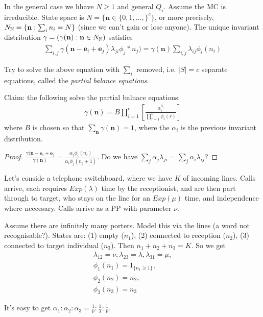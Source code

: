 \documentclass[a4paper]{article}
\begin{document}
In the general case we hhave $N \geq 1$ and general $Q_i$. Assume the MC is irreducible. State space is $N = \{\mathbf{n} \in \{0,1,...,\}^c\}$, or more precisely, $N_{\mathbb{N}} = \{\mathbf{n} : \sum_i n_i =N\}$ (since we can't gain or lose anyone). The unique invariant distribution $\gamma = (\gamma(\mathbf{n}):\mathbf{n} \in N_{\mathbb{N}})$ satisfies
\begin{equation*}
\begin{aligned}
\sum_{i,j} \gamma(\mathbf{n} - \mathbf{e}_i + \mathbf{e}_j) \lambda_{ji} \phi_j*n_j) = \gamma(\mathbf{n}) \sum_{i,j} \lambda_{ij} \phi_i(n_i)
\end{aligned}
\end{equation*}

Try to solve the above equation with $\sum_i$ removed, i.e. $|S| = c$ separate equations, called the \emph{partial balance equations}.

Claim: the following solve the partial balnace equations:
\begin{equation*}
\begin{aligned}
\gamma(\mathbf{n}) = B \prod_{i=1}^c \left[ \frac{\alpha_i^{n_i}}{\prod_{r=1}^{n_i} \phi_i(r)} \right]
\end{aligned}
\end{equation*}
where $B$ is chosen so that $\sum_{\mathbf{n}} \gamma(\mathbf{n}) = 1$, where the $\alpha_i$ is the previous invariant distribution.
\begin{proof}
$\frac{\gamma(\mathbf{n}-\mathbf{e}_i + \mathbf{e}_j}{\gamma(\mathbf{n})} = \frac{\alpha_j \phi_i(n_i)}{\alpha_i\phi_j(n_j+1)}$. Do we have $\sum_j \alpha_j \lambda_{ji} =\sum_j \alpha_i \lambda_{ij}$?
\end{proof}

\begin{eg}
Let's conside a telephone switchboard, where we have $K$ of incoming lines. Calls arrive, each requires $Exp(\lambda)$ time by the receptionist, and are then part through to target, who stays on the line for an $Exp(\mu)$ time, and independence where neccesary. Calls arrive as a PP with parameter $\nu$.

Assume there are infinitely many porters. Model this via the lines (a word not recognisable?). States are: (1) empty ($n_1$), (2) connected to reception ($n_2$), (3) connected to target individual ($n_3$). Then $n_1+n_2+n_3 = K$. So we get
\begin{equation*}
\begin{aligned}
\lambda_{12} = \nu, \lambda_{23} = \lambda, \lambda_{31} = \mu,\\
\phi_1(n_1) = 1_{\{n_1 \geq 1\}},\\
\phi_2(n_2) = n_2,\\
\phi_3(n_3) = n_3
\end{aligned}
\end{equation*}
\end{eg}
It's easy to get $\alpha_1:\alpha_2:\alpha_3 = \frac{1}{\nu} : \frac{1}{\lambda} : \frac{1}{\nu}$.
\end{document}
